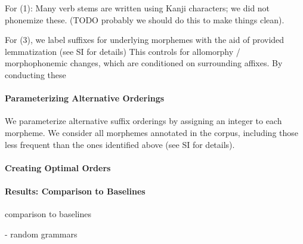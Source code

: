 For (1): Many verb stems are written using Kanji characters; we did not phonemize these. (TODO probably we should do this to make things clean).


For (3), we label suffixes for underlying morphemes with the aid of provided lemmatization (see SI for details)
This controls for allomorphy / morphophonemic changes, which are conditioned on surrounding affixes.
By conducting these 

\paragraph{Parameterizing Alternative Orderings}

We parameterize alternative suffix orderings by assigning an integer to each morpheme.
We consider all morphemes annotated in the corpus, including those less frequent than the ones identified above (see SI for details).

\paragraph{Creating Optimal Orders}

\paragraph{Results: Comparison to Baselines}
comparison to baselines

- random grammars



